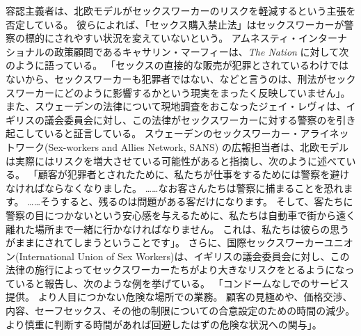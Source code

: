 \documentclass[paper=a4,book,openany]{jlreq} \usepackage{mystyle}
\begin{document}
容認主義者は、北欧モデルがセックスワーカーのリスクを軽減するという主張を否定している。
彼らによれば、「セックス購入禁止法」はセックスワーカーが警察の標的にされやすい状況を変えていないという。
アムネスティ・インターナショナルの政策顧問であるキャサリン・マーフィーは、\emph{The Nation} に対して次のように語っている。
「セックスの直接的な販売が犯罪とされているわけではないから、セックスワーカーも犯罪者ではない、などと言うのは、刑法がセックスワーカーにどのように影響するかという現実をまったく反映していません」\citep{grant16:_amnes_inter_calls_end_nordic}。
また、スウェーデンの法律について現地調査をおこなったジェイ・レヴィは、イギリスの議会委員会に対し、この法律がセックスワーカーに対する警察のを引き起こしていると証言している。
スウェーデンのセックスワーカー・アライネットワーク(Sex-workers and Allies Network, SANS) の広報担当者は、北欧モデルは実際にはリスクを増大させている可能性があると指摘し、次のように述べている。
「顧客が犯罪者とされたために、私たちが仕事をするためには警察を避けなければならなくなりました。
……なお客さんたちは警察に捕まることを恐れます。
……そうすると、残るのは問題がある客だけになります。
そして、客たちに警察の目につかないという安心感を与えるために、私たちは自動車で街から遠く離れた場所まで一緒に行かなければなりません。
これは、私たちは彼らの思うがままにされてしまうということです」\citep{savage08:_swedis_prost}。
さらに、国際セックスワーカーユニオン(International Union of Sex Workers)は、イギリスの議会委員会に対し、この法律の施行によってセックスワーカーたちがより大きなリスクをとるようになっていると報告し、次のような例を挙げている。
「コンドームなしでのサービス提供。
より人目につかない危険な場所での業務。
顧客の見極めや、価格交渉、内容、セーフセックス、その他の制限についての合意設定のための時間の減少。
より慎重に判断する時間があれば回避したはずの危険な状況への関与」\citep[p.26]{commons16:_prost}。
\end{document}
